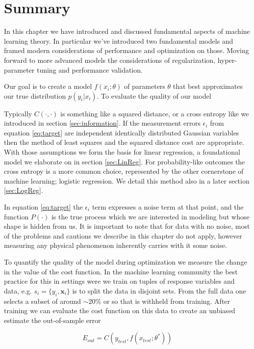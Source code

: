 \section{Summary}

In this chapter we have introduced and discussed fundamental aspects of machine learning theory. In particular we've introduced two fundamental models and framed modern considerations of performance and optimization on those. Moving forward to more advanced models the considerations of regularization, hyper-parameter tuning and performance validation.

Our goal is to create a model $f(x_i; \theta)$ of parameters $\theta$ that best approximates our true distribution $p(y_i | x_i)$. To evaluate the quality of our model 

Typically $C(\cdot, \cdot)$ is something like a squared distance, or a cross entropy like we introduced in section \ref{sec:information}. If the measurement errors $\epsilon_i$ from equation \ref{eq:target} are independent identically distributed Gaussian variables then the method of least squares and the squared distance cost are appropriate. With those assumptions we form the basis for linear regression, a foundational model we elaborate on in section \ref{sec:LinReg}. For probability-like outcomes the cross entropy is a more common choice, represented by the other cornerstone of machine learning; logistic regression. We detail this method also in a later section \ref{sec:LogReg}. 

In equation \ref{eq:target} the $\epsilon_i$ term expresses a noise term at that point, and the function $P(\cdot)$ is the true process which we are interested in modeling but whose shape is hidden from us. It is important to note that for data with no noise, most of the problems and cautions we describe in this chapter do not apply, however measuring any physical phenomenon inherently carries with it some noise.

To quantify the quality of the model during optimization we measure the change in the value of the cost function. In the machine learning community the best practice for this in settings were we train on tuples of response variables and data, e.g. $s_i = \{y_i, \boldsymbol{x}_i\}$ is to split the data in disjoint sets. From the full data one selects a subset of around $\sim 20\%$ or so that is withheld from training. After training we can evaluate the cost function on this data to create an unbiased estimate the out-of-sample error

\begin{equation}
E_{out} = C(y_{test}, f(x_{test}; \theta^*))
\end{equation}

